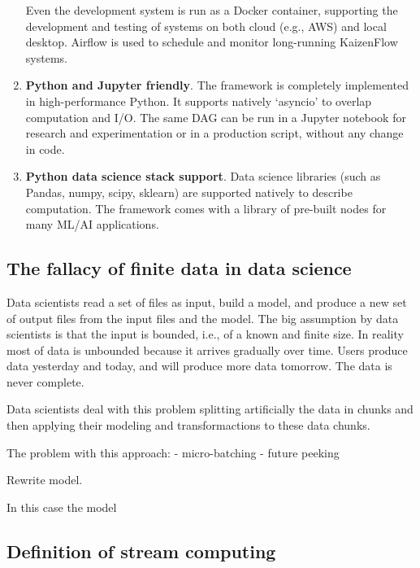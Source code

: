 \documentclass[11pt, reqno]{amsart}
\theoremstyle{definition}
\theoremstyle{remark}
\begin{document}
\begin{enumerate}
        Even the development system is run as a Docker container, supporting
        the development and testing of systems on both cloud (e.g., AWS) and
        local desktop. Airflow is used to schedule and monitor long-running
        KaizenFlow systems.
  \item \textbf{Python and Jupyter friendly}.
        The framework is completely implemented in high-performance Python.
        It supports natively `asyncio' to overlap computation and I/O. The
        same DAG can be run in a Jupyter notebook for research and
        experimentation or in a production script, without any change in
        code.
  \item \textbf{Python data science stack support}.
        Data science libraries (such as Pandas, numpy, scipy, sklearn) are
        supported natively to describe computation. The framework comes with
        a library of pre-built nodes for many ML/AI applications.
\end{enumerate}

\subsection{The fallacy of finite data in data science}

Data scientists read a set of files as input, build a model, and produce a new
set of output files from the input files and the model.
The big assumption by data scientists is that the input is bounded, i.e., of a
known and finite size. In reality most of data is unbounded because it arrives
gradually over time.
Users produce data yesterday and today, and will produce more data tomorrow.
The data is never complete.

Data scientists deal with this problem splitting artificially the data in chunks
and then applying their modeling and transformactions to these data chunks.

The problem with this approach:
- micro-batching
- future peeking

Rewrite model.

In this case the model

\subsection{Definition of stream computing}
\end{document}
